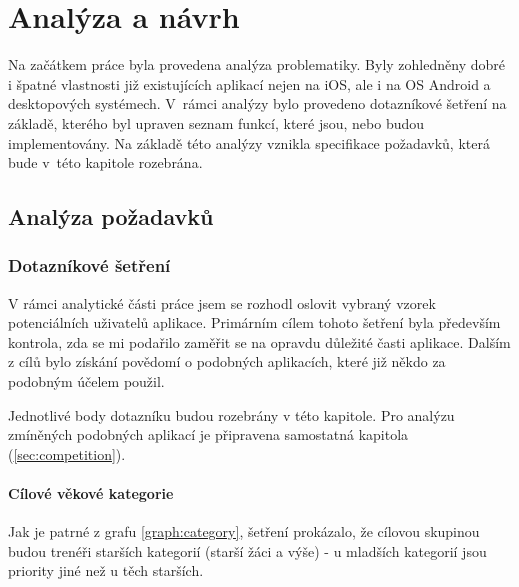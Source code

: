\documentclass[thesis=B,czech]{FITthesis}[2012/06/26]
\begin{document}
\chapter{Analýza a návrh}

	Na začátkem práce byla provedena analýza problematiky. Byly zohledněny dobré i špatné vlastnosti již existujících aplikací nejen na iOS, ale i na OS Android a desktopových systémech. V~rámci analýzy bylo provedeno dotazníkové šetření na základě, kterého byl upraven seznam funkcí, které jsou, nebo budou implementovány. Na základě této analýzy vznikla specifikace požadavků, která bude v~této kapitole rozebrána.

\section{Analýza požadavků}

\subsection{Dotazníkové šetření}

	V rámci analytické části práce jsem se rozhodl oslovit vybraný vzorek potenciálních uživatelů aplikace. Primárním cílem tohoto šetření byla především kontrola, zda se mi podařilo zaměřit se na opravdu důležité časti aplikace. Dalším z cílů bylo získání povědomí o podobných aplikacích, které již někdo za podobným účelem použil.

	Jednotlivé body dotazníku budou rozebrány v této kapitole. Pro analýzu zmíněných podobných aplikací je připravena samostatná kapitola (\ref{sec:competition}).

\subsubsection{Cílové věkové kategorie}

	Jak je patrné z grafu \ref{graph:category}, šetření prokázalo, že cílovou skupinou budou trenéři starších kategorií (starší žáci a výše) \-- u mladších kategorií jsou priority jiné než u těch starších.
\end{document}
